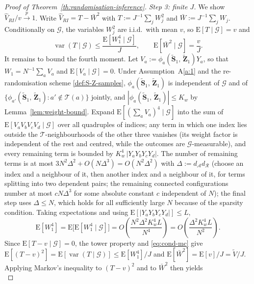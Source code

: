 \documentclass[sigconf,nonacm]{acmart}
\newcommand{\E}{\mathrm E}
\DeclareMathOperator{\var}{var}
\begin{document}
\begin{proof}[Proof of Theorem~\ref{th:randomisation-inference}]
    \emph{Step 3: finite $J$.} We show $\hat V_{RI}/v\stackrel{p}{\to}1$. Write $\hat V_{RI} = T - \bar W^2$ with $T := J^{-1}\sum_j W_j^2$ and $\bar W := J^{-1}\sum_jW_j$. Conditionally on $\mathcal G$, the variables $W_j^2$ are i.i.d.\ with mean $v$, so $\E[T\mid\mathcal G] = v$ and
    \begin{equation}\label{eq:cond-mc}
        \var\left(T\mid \mathcal G\right) \le \frac{\E[W_1^4\mid\mathcal G]}{J},\qquad \E[\bar W^2\mid \mathcal G] = \frac vJ.
    \end{equation}
    It remains to bound the fourth moment. Let $V_a := \phi_a(\tilde{\mathbf S}_1,\,\tilde{\mathbf Z}_1)Y_a$, so that $W_1 = N^{-1}\sum_aV_a$ and $\E[V_a\mid\mathcal G]=0$. Under Assumption~A\ref{a:1} and the re-randomisation scheme \eqref{def:S-Z-samples}, $\phi_a(\tilde{\mathbf S}_1,\,\tilde{\mathbf Z}_1)$ is independent of $\mathcal G$ and of $\{\phi_{a'}(\tilde{\mathbf S}_1,\,\tilde{\mathbf Z}_1)\colon a'\notin\mathcal T(a)\}$ jointly, and $|\phi_a(\tilde{\mathbf S}_1,\,\tilde{\mathbf Z}_1)|\le K_w$ by Lemma~\ref{lem:weight-bound}. Expand $\E[(\sum_aV_a)^4\mid\mathcal G]$ into the sum of $\E[V_aV_bV_cV_d\mid\mathcal G]$ over all quadruples of indices; any term in which one index lies outside the $\mathcal T$-neighbourhoods of the other three vanishes (its weight factor is independent of the rest and centred, while the outcomes are $\mathcal G$-measurable), and every remaining term is bounded by $K_w^4\,|Y_aY_bY_cY_d|$. The number of remaining terms is at most $3N^2\Delta^2 + O(N\Delta^3) = O(N^2\Delta^2)$ with $\Delta := d_{\mathcal A}d_{\mathcal R}$ (choose an index and a neighbour of it, then another index and a neighbour of it, for terms splitting into two dependent pairs; the remaining connected configurations number at most $cN\Delta^3$ for some absolute constant $c$ independent of $N$); the final step uses $\Delta\le N$, which holds for all sufficiently large $N$ because of the sparsity condition. Taking expectations and using $\E[|Y_aY_bY_cY_d|]\le L$,
    \begin{equation*}
        \E[W_1^4] = \E\bigl[\E[W_1^4\mid \mathcal G]\bigr] = O\left(\frac{N^2\Delta^2 K_w^4L}{N^4}\right) = O\left(\frac{\Delta^2K_w^4L}{N^2}\right).
    \end{equation*}
    Since $\E[T-v\mid\mathcal G]=0$, the tower property and \eqref{eq:cond-mc} give $\E[(T-v)^2] = \E[\var(T\mid\mathcal G)]\le \E[W_1^4]/J$ and $\E[\bar W^2] = \E[v]/J = \tilde V/J$. Applying Markov's inequality to $(T-v)^2$ and to $\bar W^2$ then yields
    \begin{equation*}

\end{equation*}
\end{proof}
\end{document}
